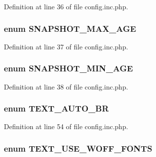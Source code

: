 Definition at line 36 of file config.inc.php.

\hypertarget{config_8inc_8php_aa9c8d739795b1000f6ea105992a4e488}{
\subsubsection[{SNAPSHOT\_\-MAX\_\-AGE}]{\setlength{\rightskip}{0pt plus 5cm}enum {\bf SNAPSHOT\_\-MAX\_\-AGE}}}
\label{config_8inc_8php_aa9c8d739795b1000f6ea105992a4e488}


Definition at line 37 of file config.inc.php.

\hypertarget{config_8inc_8php_a7fb94ff6aaa61e964fe2f90f738d5cb3}{
\subsubsection[{SNAPSHOT\_\-MIN\_\-AGE}]{\setlength{\rightskip}{0pt plus 5cm}enum {\bf SNAPSHOT\_\-MIN\_\-AGE}}}
\label{config_8inc_8php_a7fb94ff6aaa61e964fe2f90f738d5cb3}


Definition at line 38 of file config.inc.php.

\hypertarget{config_8inc_8php_a6f581226f389510394c592491ebedc0b}{
\subsubsection[{TEXT\_\-AUTO\_\-BR}]{\setlength{\rightskip}{0pt plus 5cm}enum {\bf TEXT\_\-AUTO\_\-BR}}}
\label{config_8inc_8php_a6f581226f389510394c592491ebedc0b}


Definition at line 54 of file config.inc.php.

\hypertarget{config_8inc_8php_aca83853e44d4952801b133bf687a1056}{
\subsubsection[{TEXT\_\-USE\_\-WOFF\_\-FONTS}]{\setlength{\rightskip}{0pt plus 5cm}enum {\bf TEXT\_\-USE\_\-WOFF\_\-FONTS}}}
\label{config_8inc_8php_aca83853e44d4952801b133bf687a1056}


